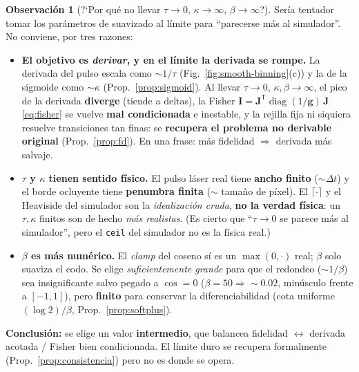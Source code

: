 \documentclass[11pt,a4paper]{article}
\theoremstyle{plain}
\theoremstyle{definition}
\newtheorem{remark}{Observaci\'on}
\newcommand{\vect}[1]{\boldsymbol{#1}}
\newcommand{\matr}[1]{\mathbf{#1}}
\DeclareMathOperator{\diag}{diag}
\begin{document}
\begin{remark}[\textup{?`}Por qu\'e no llevar $\tau\to0$, $\kappa\to\infty$, $\beta\to\infty$?]
\label{rem:trade-off}
Ser\'ia tentador tomar los par\'ametros de suavizado al l\'imite para ``parecerse
m\'as al simulador''. No conviene, por tres razones:
\begin{itemize}[nosep]
    \item \textbf{El objetivo es \emph{derivar}, y en el l\'imite la derivada se
    rompe.} La derivada del pulso escala como $\sim1/\tau$
    (Fig.~\ref{fig:smooth-binning}(c)) y la de la sigmoide como $\sim\kappa$
    (Prop.~\ref{prop:sigmoid}). Al llevar $\tau\to0$, $\kappa,\beta\to\infty$, el
    pico de la derivada \textbf{diverge} (tiende a deltas), la Fisher
    $\matr I=\matr J^{\mathsf T}\diag(1/\vect g)\,\matr J$ \eqref{eq:fisher} se
    vuelve \textbf{mal condicionada} e inestable, y la rejilla fija ni siquiera
    resuelve transiciones tan finas: se \textbf{recupera el problema no derivable
    original} (Prop.~\ref{prop:fd}). En una frase: m\'as fidelidad $\Rightarrow$
    derivada m\'as salvaje.
    \item \textbf{$\tau$ y $\kappa$ tienen sentido f\'isico.} El pulso l\'aser real
    tiene \textbf{ancho finito} ($\sim\Delta t$) y el borde ocluyente tiene
    \textbf{penumbra finita} ($\sim$ tama\~no de p\'ixel). El $\lceil\cdot\rceil$ y
    el Heaviside del simulador son la \emph{idealizaci\'on cruda}, \textbf{no la
    verdad f\'isica}: un $\tau,\kappa$ finitos son de hecho \emph{m\'as realistas}.
    (Es cierto que ``$\tau\to0$ se parece m\'as al simulador'', pero el
    \texttt{ceil} del simulador no es la f\'isica real.)
    \item \textbf{$\beta$ es m\'as num\'erico.} El \emph{clamp} del coseno s\'i es un
    $\max(0,\cdot)$ real; $\beta$ solo suaviza el codo. Se elige
    \emph{suficientemente grande} para que el redondeo ($\sim1/\beta$) sea
    insignificante salvo pegado a $\cos=0$ ($\beta=50\Rightarrow\sim0.02$,
    min\'usculo frente a $[-1,1]$), pero \textbf{finito} para conservar la
    diferenciabilidad (cota uniforme $(\log2)/\beta$, Prop.~\ref{prop:softplus}).
\end{itemize}
\textbf{Conclusi\'on:} se elige un valor \textbf{intermedio}, que balancea
fidelidad $\leftrightarrow$ derivada acotada / Fisher bien condicionada. El
l\'imite duro se recupera formalmente (Prop.~\ref{prop:consistencia}) pero no es
donde se opera.
\end{remark}

\end{document}
